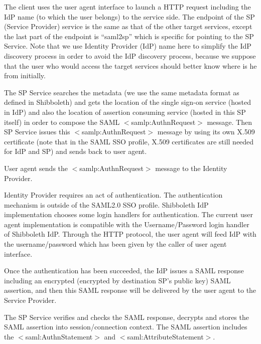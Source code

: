 \documentclass{book}
\begin{document}
  \begin{list}{.}
  {\setlength{\rightmargin}{\leftmargin}}
    \item The client uses the user agent interface to launch a HTTP request including the IdP name (to which the user belongs) to the service side. The endpoint of the SP (Service Provider) service is the same as that of the other target services, except the last part of the endpoint is ``saml2sp'' which is specific for pointing to the SP Service. Note that we use Identity Provider (IdP) name here to simplify the IdP discovery process in order to avoid the IdP discovery process, because we suppose that the user who would access the target services should better know where is he from initially.

    \item The SP Service searches the metadata (we use the same metadata format as defined in Shibboleth) and gets the location of the single sign-on service (hosted in IdP) and also the location of assertion consuming service (hosted in this SP itself) in order to compose the SAML $<$samlp:AuthnRequest$>$ message. Then SP Service issues this $<$samlp:AuthnRequest$>$ message by using its own X.509 certificate (note that in the SAML SSO profile, X.509 certificates are still needed for IdP and SP) and sends back to user agent.

    \item User agent sends the $<$samlp:AuthnRequest$>$ message to the Identity Provider.

    \item Identity Provider requires an act of authentication. The authentication mechanism is outside of the SAML2.0 SSO profile. Shibboleth IdP implementation chooses some login handlers for authentication. The current user agent implementation is compatible with the Username/Password login handler of Shibboleth IdP. Through the HTTP protocol, the user agent will feed IdP with the username/password which has been given by the caller of user agent interface.

    \item Once the authentication has been succeeded, the IdP issues a SAML response including an encrypted (encrypted by destination SP’s public key) SAML assertion, and then this SAML response will be delivered by the user agent to the Service Provider.

    \item The SP Service verifies and checks the SAML response, decrypts and stores the SAML assertion into session/connection context. The SAML assertion includes the $<$saml:AuthnStatement$>$ and $<$saml:AttributeStatement$>$.


\end{list}
\end{document}
